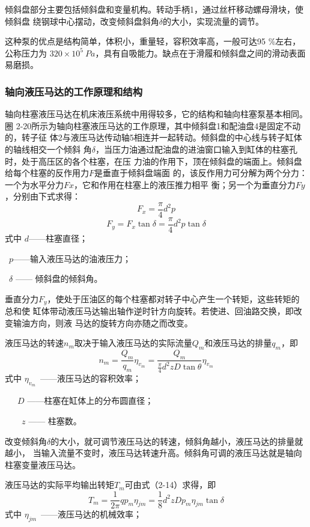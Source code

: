 倾斜盘部分主要包括倾斜盘和变量机构。转动手柄1，通过丝杆移动螺母滑块，使倾斜盘
绕钢球中心摆动，改变倾斜盘斜角$\delta $的大小，实现流量的调节。

这种泵的优点是结构简单，体积小，重量轻，容积效率高，一般可达95 \%左右，公称压力为
$320×10^5\ Pa$，具有自吸能力。缺点在于滑履和倾斜盘之间的滑动表面易磨损。

\subsubsection{轴向液压马达的工作原理和结构}

轴向柱塞液压马达在机床液压系统中用得较多，它的结构和轴向柱塞泵基本相同。圈
2-20所示为轴向柱塞液压马达的工作原理，其中倾斜盘1和配油盘4是固定不动的，转子征
体2与液压马达传动轴5相连并一起转动。倾斜盘的中心线与转子缸体的轴线相交一个倾斜
角$\delta $，当压力油通过配油盘的进油窗口输入到缸体的柱塞孔时，处于高压区的各个柱塞，在压
力油的作用下，顶在倾斜盘的端面上。倾斜盘给每个柱塞的反作用力$F$是垂直于倾斜盘端面
的，该反作用力可分解为两个分力：一个为水平分力$Fx$，它和作用在柱塞上的液压推力相平
衡；另一个为垂直分力$Fy$，分别由下式求得：
$$F_{x}=\frac{\pi }{4}d^2p $$
$$F_{y}=F_{x}\tan \delta =\frac{\pi }{4}d^2p\tan \delta $$
式中  \qquad $d$——柱塞直径；

\qquad \ $p$——输入液压马达的油液压力；

\qquad\ $\delta$ —— 倾斜盘的倾斜角。

垂直分力$F_{y}$，使处于压油区的每个柱塞都对转子中心产生一个转矩，这些转矩的总和使
缸体带动液压马达输出轴作逆时针方向旋转。若使进、回油路交换，即改变输油方向，则液
马达的旋转方向亦随之而改变。

液压马达的转速$n_{m}$取决于输入液压马达的实际流量$Q_{m}$和液压马达的排量$q_{m}$，即
\begin{equation}
    n_{m}=\frac{Q_{m}}{q_{m}}\eta _{v_{m}}=\frac{Q_{m}}{\frac{\pi }{4}d^2zD\tan \theta } \eta _{v_{m}}  
\end{equation}
式中 \qquad  $\eta _{v_{m}}  $\ ——液压马达的容积效率；

\qquad \ \ \ $D$ ——柱塞在缸体上的分布圆直径；

\qquad \ \ \ \ $z$ —— 柱塞数。

改变倾斜角$\delta $的大小，就可调节液压马达的转速，倾斜角越小，液压马达的排量就越小，
当输入流量不变时，液压马达转速升高。倾斜角可调的液压马达就是轴向柱塞变量液压马达。

液压马达的实际平均输出转矩$T_{m}$可由式（2-14）求得，即
\begin{equation}
       T_{m}= \frac{1}{2\pi}q p_{m}\eta _{jm}=
     \frac{1}{8}d^2zDp_{m}\eta _{jm}\tan\delta  
\end{equation}
式中  \qquad $\eta _{jm}$\ ——液压马达的机械效率；


